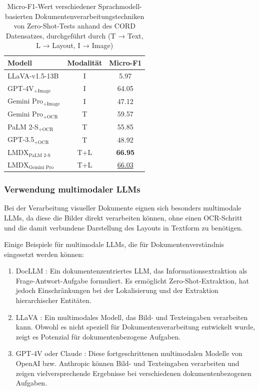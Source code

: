 \begin{table}
\centering
\begin{tabular}{lcc}
\hline
Modell & Modalität & Micro-F1 \\
\hline
LLaVA-v1.5-13B & I & 5.97 \\
GPT-4V$_\text{+Image}$ & I & 64.05 \\
Gemini Pro$_\text{+Image}$ & I & 47.12 \\
Gemini Pro$_\text{+OCR}$ & T & 59.57 \\
PaLM 2-S$_\text{+OCR}$ & T & 55.85 \\
GPT-3.5$_\text{+OCR}$ & T & 48.92 \\
LMDX$_\text{PaLM 2-S}$ & T+L & \textbf{66.95} \\
LMDX$_\text{Gemini Pro}$ & T+L & \underline{66.03} \\
\hline
\end{tabular}
\caption{Micro-F1-Wert verschiedener Sprachmodell-basierten Dokumentenverarbeitungstechniken von Zero-Shot-Tests anhand des CORD \cite{park2019cord} Datensatzes, durchgeführt durch \textcite{PerotVincent2024LLMD} (T → Text, L → Layout, I → Image) }
\label{tab:lmdx_cord_zero_shot_results}
\end{table}

\subsubsection{Verwendung multimodaler \glspl{LLM}}
\label{subsec:verwendung-multimodaler-llms}

Bei der Verarbeitung visueller Dokumente eignen sich besonders multimodale \glspl{LLM}, da diese die Bilder direkt verarbeiten können, ohne einen \gls{OCR}-Schritt und die damit verbundene Darstellung des Layouts in Textform zu benötigen.

Einige Beispiele für multimodale \glspl{LLM}, die für Dokumentenverständnis eingesetzt werden können:

\begin{enumerate}
    \item DocLLM \cite{WangDongsheng2023DAlg}: Ein dokumentenzentriertes \gls{LLM}, das Informationsextraktion als Frage-Antwort-Aufgabe formuliert. Es ermöglicht Zero-Shot-Extraktion, hat jedoch Einschränkungen bei der Lokalisierung und der Extraktion hierarchischer Entitäten.
    \item LLaVA \cite{CaffagniDavide2024WHRG}: Ein multimodales Modell, das Bild- und Texteingaben verarbeiten kann. Obwohl es nicht speziell für Dokumentenverarbeitung entwickelt wurde, zeigt es Potenzial für dokumentenbezogene Aufgaben.
    \item GPT-4V \cite{openai_chatgpt} oder Claude \cite{anthropic_claude}: Diese fortgeschrittenen multimodalen Modelle von OpenAI bzw. Anthropic können Bild- und Texteingaben verarbeiten und zeigen vielversprechende Ergebnisse bei verschiedenen dokumentenbezogenen Aufgaben.
\end{enumerate}

